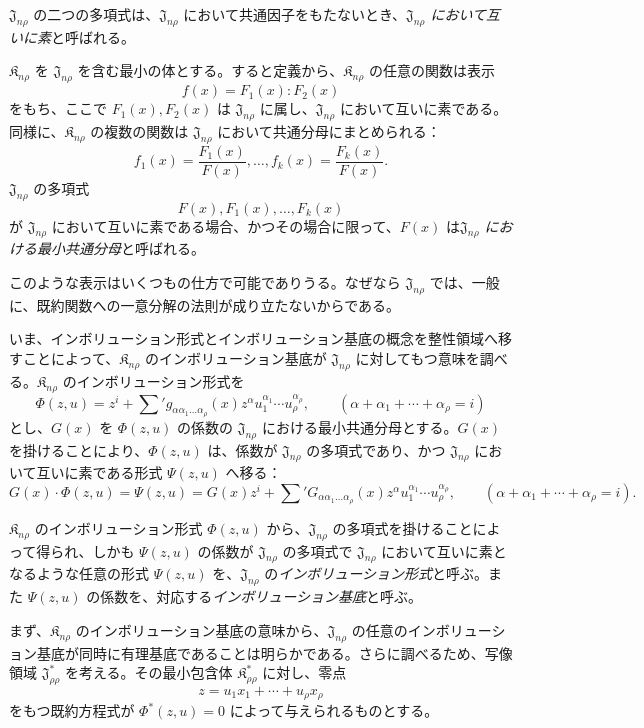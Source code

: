 \documentclass[11pt]{jlreq}
\providecommand{\Kfield}{\mathfrak{K}}
\providecommand{\Jdom}{\mathfrak{J}}
\begin{document}
$\Jdom_{n\rho}$ の二つの多項式は、$\Jdom_{n\rho}$ において共通因子をもたないとき、\emph{$\Jdom_{n\rho}$ において互いに素}と呼ばれる。

$\Kfield_{n\rho}$ を $\Jdom_{n\rho}$ を含む最小の体とする。すると定義から、$\Kfield_{n\rho}$ の任意の関数は表示
\[
  f(x)=F_1(x):F_2(x)
\]
をもち、ここで $F_1(x),F_2(x)$ は $\Jdom_{n\rho}$ に属し、$\Jdom_{n\rho}$ において互いに素である。同様に、$\Kfield_{n\rho}$ の複数の関数は $\Jdom_{n\rho}$ において共通分母にまとめられる：
\[
  f_1(x)=\frac{F_1(x)}{F(x)},\ldots,
  f_k(x)=\frac{F_k(x)}{F(x)}.
\]
$\Jdom_{n\rho}$ の多項式
\[
  F(x),F_1(x),\ldots,F_k(x)
\]
が $\Jdom_{n\rho}$ において互いに素である場合、かつその場合に限って、$F(x)$ は\emph{$\Jdom_{n\rho}$ における最小共通分母}と呼ばれる。

このような表示はいくつもの仕方で可能でありうる。なぜなら $\Jdom_{n\rho}$ では、一般に、既約関数への一意分解の法則が成り立たないからである。

いま、インボリューション形式とインボリューション基底の概念を整性領域へ移すことによって、$\Kfield_{n\rho}$ のインボリューション基底が $\Jdom_{n\rho}$ に対してもつ意味を調べる。$\Kfield_{n\rho}$ のインボリューション形式を
\[
  \Phi(z,u)=z^i+\sum{}' g_{\alpha\alpha_1\ldots\alpha_\rho}(x)
  z^\alpha u_1^{\alpha_1}\cdots u_\rho^{\alpha_\rho},
  \qquad
  (\alpha+\alpha_1+\cdots+\alpha_\rho=i)
\]
とし、$G(x)$ を $\Phi(z,u)$ の係数の $\Jdom_{n\rho}$ における最小共通分母とする。$G(x)$ を掛けることにより、$\Phi(z,u)$ は、係数が $\Jdom_{n\rho}$ の多項式であり、かつ $\Jdom_{n\rho}$ において互いに素である形式 $\Psi(z,u)$ へ移る：
\[
  G(x)\cdot\Phi(z,u)=\Psi(z,u)
  =G(x)z^i+
  \sum{}' G_{\alpha\alpha_1\ldots\alpha_\rho}(x)
  z^\alpha u_1^{\alpha_1}\cdots u_\rho^{\alpha_\rho},
  \qquad
  (\alpha+\alpha_1+\cdots+\alpha_\rho=i).
\]

$\Kfield_{n\rho}$ のインボリューション形式 $\Phi(z,u)$ から、$\Jdom_{n\rho}$ の多項式を掛けることによって得られ、しかも $\Psi(z,u)$ の係数が $\Jdom_{n\rho}$ の多項式で $\Jdom_{n\rho}$ において互いに素となるような任意の形式 $\Psi(z,u)$ を、$\Jdom_{n\rho}$ の\emph{インボリューション形式}と呼ぶ。また $\Psi(z,u)$ の係数を、対応する\emph{インボリューション基底}と呼ぶ。

まず、$\Kfield_{n\rho}$ のインボリューション基底の意味から、$\Jdom_{n\rho}$ の任意のインボリューション基底が同時に有理基底であることは明らかである。さらに調べるため、写像領域 $\Jdom^*_{\rho\rho}$ を考える。その最小包含体 $\Kfield^*_{\rho\rho}$ に対し、零点
\[
  z=u_1x_1+\cdots+u_\rho x_\rho
\]
をもつ既約方程式が $\Phi^*(z,u)=0$ によって与えられるものとする。
\end{document}
